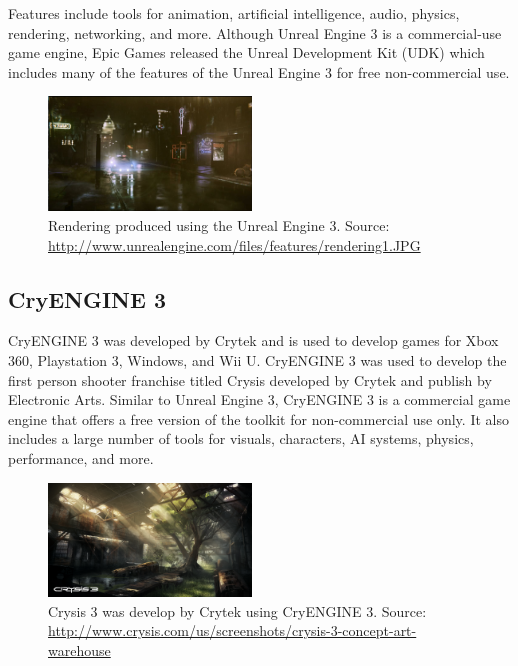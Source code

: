 Features include tools for animation, artificial intelligence, audio, physics, rendering, networking, and more. Although Unreal Engine 3 is a commercial-use game engine, Epic Games released the Unreal Development Kit (UDK) which includes many of the features of the Unreal Engine 3 for free non-commercial use.

\begin{figure}[!ht]
  \centering \includegraphics[width=0.48\textwidth]{Images/unreal_engine3_rendering.jpg}
	\caption{Rendering produced using the Unreal Engine 3. Source: \url{http://www.unrealengine.com/files/features/rendering1.JPG}}
\end{figure}

\subsection{CryENGINE 3}
CryENGINE 3 was developed by Crytek and is used to develop games for Xbox 360, Playstation 3, Windows, and Wii U. CryENGINE 3 was used to develop the first person shooter franchise titled Crysis developed by Crytek and publish by Electronic Arts. Similar to Unreal Engine 3, CryENGINE 3 is a commercial game engine that offers a free version of the toolkit for non-commercial use only. It also includes a large number of tools for visuals, characters, AI systems, physics, performance, and more.
\begin{figure}[!ht]
  \centering \includegraphics[width=0.48\textwidth]{Images/Crysis3_Fields_Warehouse_ConceptArt.png}
	\caption{Crysis 3 was develop by Crytek using CryENGINE 3. Source: \url{http://www.crysis.com/us/screenshots/crysis-3-concept-art-warehouse}}
\end{figure}


